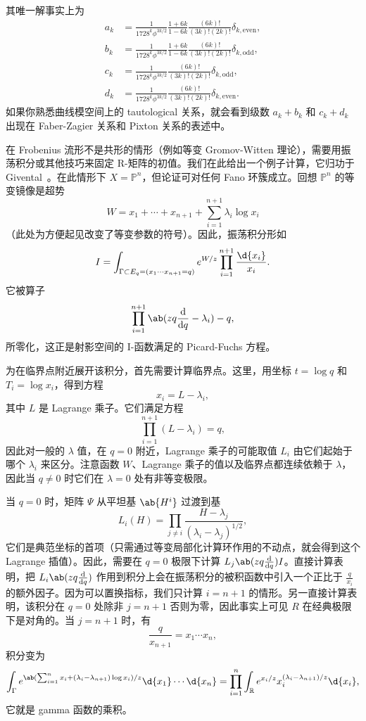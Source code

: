 \documentclass{amsart}
\theoremstyle{definition}
\theoremstyle{remark}
\theoremstyle{plain}
\theoremstyle{definition}
\theoremstyle{remark}
\newcommand{\R}{\mathbb{R}}
\renewcommand{\P}{\mathbb{P}}
\newcommand{\1}{\mathbf{1}}
\newcommand{\2}{\mathbf{2}}
\newcommand{\3}{\mathbf{3}}
\begin{document}
其唯一解事实上为
\begin{align*}
    a_k &= \frac{1}{1728^k \phi^{3k/2}} \frac{1+6k}{1-6k} \frac{(6k)!}{(3k)!(2k)!} \delta_{k, \text{even}},  \\
    b_k &= \frac{1}{1728^k \phi^{3k/2}} \frac{1+6k}{1-6k}\frac{(6k)!}{(3k)!(2k)!} \delta_{k, \text{odd}},  \\
    c_k &= \frac{1}{1728^k \phi^{3k/2}}\frac{(6k)!}{(3k)!(2k)!} \delta_{k, \text{odd}}, \\
    d_k &= \frac{1}{1728^k \phi^{3k/2}} \frac{(6k)!}{(3k)!(2k)!} \delta_{k, \text{even}}. 
\end{align*}
如果你熟悉曲线模空间上的 tautological 关系，就会看到级数 \(a_k + b_k\) 和 \(c_k + d_k\) 出现在 Faber-Zagier 关系和 Pixton 关系的表述中。

在 Frobenius 流形不是共形的情形（例如等变 Gromov-Witten 理论），需要用振荡积分或其他技巧来固定 R-矩阵的初值。我们在此给出一个例子计算，它归功于 Givental~\cite{Givental2001semisimple}。在此情形下 \(X = \P^n\)，但论证可对任何 Fano 环簇成立。回想 \(\P^n\) 的等变镜像是超势
\[ W = x_1 + \cdots + x_{n+1} + \sum_{i=1}^{n+1} \lambda_i \log x_i \]
（此处为方便起见改变了等变参数的符号）。因此，振荡积分形如
\[ I = \int_{\Gamma \subset E_q = (x_1 \cdots x_{n+1}=q)} e^{W/z} \prod_{i=1}^{n+1} \frac{\d{x_i}}{x_i}. \]
它被算子
\[ \prod_{i=1}^{n+1}\ab(zq \odv{}{q} -\lambda_i) - q, \]
所零化，这正是射影空间的 I-函数满足的 Picard-Fuchs 方程。

为在临界点附近展开该积分，首先需要计算临界点。这里，用坐标 \(t = \log q\) 和 \(T_i = \log x_i\)，得到方程
\[ x_i = L - \lambda_i, \]
其中 \(L\) 是 Lagrange 乘子。它们满足方程
\[ \prod_{i=1}^{n+1} (L - \lambda_i) = q, \]
因此对一般的 \(\lambda\) 值，在 \(q = 0\) 附近，Lagrange 乘子的可能取值 \(L_i\) 由它们起始于哪个 \(\lambda_i\) 来区分。注意函数 \(W\)、Lagrange 乘子的值以及临界点都连续依赖于 \(\lambda\)，因此当 \(q \neq 0\) 时它们在 \(\lambda = 0\) 处有非等变极限。

当 \(q = 0\) 时，矩阵 \(\Psi\) 从平坦基 \(\ab{H^i}\) 过渡到基
\[ L_i(H) = \prod_{j \neq i} \frac{H - \lambda_j}{(\lambda_i - \lambda_j)^{1/2}}, \]
它们是典范坐标的首项（只需通过等变局部化计算环作用的不动点，就会得到这个 Lagrange 插值）。因此，需要在 \(q = 0\) 极限下计算 \(L_j \ab(z q \odv{}{q}) I\)。直接计算表明，把 \(L_i \ab(z q \odv{}{q})\) 作用到积分上会在振荡积分的被积函数中引入一个正比于 \(\frac{q}{x_i}\) 的额外因子。因为可以置换指标，我们只计算 \(i = n+1\) 的情形。另一直接计算表明，该积分在 \(q = 0\) 处除非 \( j = n+1\) 否则为零，因此事实上可见 \(R\) 在经典极限下是对角的。当 \(j = n+1\) 时，有
\[ \frac{q}{x_{n+1}} = x_1 \cdots x_n, \]
积分变为
\[ \int_{\Gamma} e^{\ab( \sum_{i=1}^n x_i + (\lambda_i - \lambda_{n+1})\log x_i ) / z} \d{x_1} \cdots \d{x_n} = \prod_{i=1}^n \int_{\R} e^{x_i/z} x_i^{(\lambda_i - \lambda_{n+1})/z} \d{x_i}, \]
它就是 gamma 函数的乘积。
\end{document}
